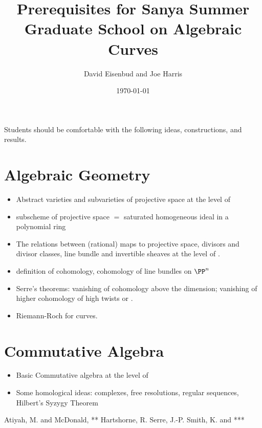 \documentclass[12pt, leqno]{book}
\title{Prerequisites for Sanya Summer Graduate School on Algebraic Curves}
\author{ David Eisenbud and Joe Harris}
\date{\today}
\makeatletter
\def@{\mskip1.5mu} %
\makeatother
\begin{document}
\maketitle

\setcounter{page}{5}

Students should be comfortable with the following ideas, constructions, and results.

\section*{Algebraic Geometry}

\begin{itemize}
\item Abstract varieties and subvarieties of projective space at the level of \cite[Chapterd 1--3 ]{S}
\item subscheme of projective space $=$ saturated homogeneous ideal in a polynomial ring 
\item The relations between (rational) maps to projective space, divisors and divisor classes, line bundle and invertible sheaves at the level of \cite[Chapter 8 and Appendix]{S}.
\item definition of cohomology, cohomology of line bundles on $\PP^{n}$ \cite{FAC}
\item Serre's theorems: vanishing of cohomology above the dimension; vanishing of higher cohomology of high twists \cite{FAC} or \cite[Ch 3]{H}.
\item Riemann-Roch for curves. \cite[Section IV.1]{H} 
\end{itemize}

\section*{Commutative Algebra}
\begin{itemize}
\item Basic Commutative algebra at the level of \cite{A}
\item Some homological ideas: complexes, free resolutions, regular sequences, Hilbert's Syzygy Theorem 
\end{itemize}
\begin{thebibliography}{99}
 Atiyah, M. and McDonald, ** 
 Hartshorne, R.
 Serre, J.-P.
 Smith, K. and ***
\end{thebibliography}
\end{document}
